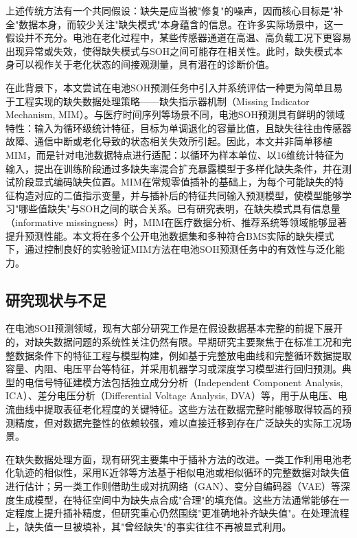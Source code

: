 \documentclass[10pt,a4paper]{ctexart}
\begin{document}
上述传统方法有一个共同假设：缺失是应当被"修复"的噪声，因而核心目标是"补全"数据本身，而较少关注"缺失模式"本身蕴含的信息。在许多实际场景中，这一假设并不充分。电池在老化过程中，某些传感器通道在高温、高负载工况下更容易出现异常或失效，使得缺失模式与SOH之间可能存在相关性。此时，缺失模式本身可以视作关于老化状态的间接观测量，具有潜在的诊断价值。

在此背景下，本文尝试在电池SOH预测任务中引入并系统评估一种更为简单且易于工程实现的缺失数据处理策略——缺失指示器机制（Missing Indicator Mechanism, MIM）\cite{jones1996indicator,van2023missing}。与医疗时间序列等场景不同，电池SOH预测具有鲜明的领域特性：输入为循环级统计特征，目标为单调退化的容量比值，且缺失往往由传感器故障、通信中断或老化导致的状态相关失效所引起。因此，本文并非简单移植MIM，而是针对电池数据特点进行适配：以循环为样本单位、以16维统计特征为输入，提出在训练阶段通过多缺失率混合扩充暴露模型于多样化缺失条件，并在测试阶段显式编码缺失位置。MIM在常规零值插补的基础上，为每个可能缺失的特征构造对应的二值指示变量，并与插补后的特征共同输入预测模型，使模型能够学习"哪些值缺失"与SOH之间的联合关系。已有研究表明，在缺失模式具有信息量（informative missingness）时，MIM在医疗数据分析、推荐系统等领域能够显著提升预测性能\cite{sisk2023imputation,ehrig2025imputation}。本文将在多个公开电池数据集和多种符合BMS实际的缺失模式下，通过控制良好的实验验证MIM方法在电池SOH预测任务中的有效性与泛化能力。

\subsection{研究现状与不足}

在电池SOH预测领域，现有大部分研究工作是在假设数据基本完整的前提下展开的，对缺失数据问题的系统性关注仍然有限\cite{shao2025soh}。早期研究主要聚焦于在标准工况和完整数据条件下的特征工程与模型构建，例如基于完整放电曲线和完整循环数据提取容量、内阻、电压平台等特征，并采用机器学习或深度学习模型进行回归预测。典型的电信号特征建模方法包括独立成分分析（Independent Component Analysis, ICA）、差分电压分析（Differential Voltage Analysis, DVA）等，用于从电压、电流曲线中提取表征老化程度的关键特征\cite{deng2025novel}。这些方法在数据完整时能够取得较高的预测精度，但对数据完整性的依赖较强，难以直接迁移到存在广泛缺失的实际工况场景。

在缺失数据处理方面，现有研究主要集中于插补方法的改进。一类工作利用电池老化轨迹的相似性，采用K近邻等方法基于相似电池或相似循环的完整数据对缺失值进行估计；另一类工作则借助生成对抗网络（GAN）、变分自编码器（VAE）等深度生成模型，在特征空间中为缺失点合成"合理"的填充值。这些方法通常能够在一定程度上提升插补精度，但研究重心仍然围绕"更准确地补齐缺失值"。在处理流程上，缺失值一旦被填补，其"曾经缺失"的事实往往不再被显式利用。
\end{document}
